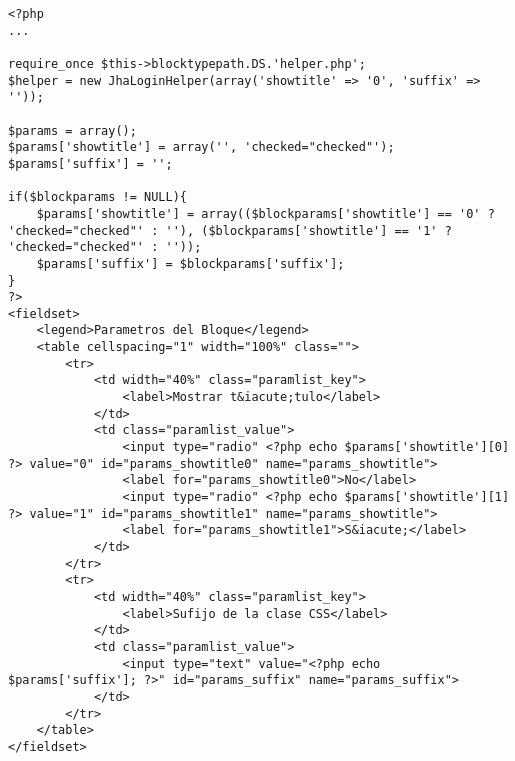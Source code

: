 \begin{lstlisting}[label=jha_block_login_params,caption=Parametros de configuraci\'on.]
<?php
...

require_once $this->blocktypepath.DS.'helper.php';
$helper = new JhaLoginHelper(array('showtitle' => '0', 'suffix' => ''));

$params = array();
$params['showtitle'] = array('', 'checked="checked"');
$params['suffix'] = '';

if($blockparams != NULL){
	$params['showtitle'] = array(($blockparams['showtitle'] == '0' ? 'checked="checked"' : ''), ($blockparams['showtitle'] == '1' ? 'checked="checked"' : ''));
	$params['suffix'] = $blockparams['suffix'];
}
?>
<fieldset>
    <legend>Parametros del Bloque</legend>
    <table cellspacing="1" width="100%" class="">
        <tr>
            <td width="40%" class="paramlist_key">
                <label>Mostrar t&iacute;tulo</label>
            </td>
            <td class="paramlist_value">
                <input type="radio" <?php echo $params['showtitle'][0] ?> value="0" id="params_showtitle0" name="params_showtitle">
                <label for="params_showtitle0">No</label>
                <input type="radio" <?php echo $params['showtitle'][1] ?> value="1" id="params_showtitle1" name="params_showtitle">
                <label for="params_showtitle1">S&iacute;</label>
            </td>
        </tr>
		<tr>
            <td width="40%" class="paramlist_key">
                <label>Sufijo de la clase CSS</label>
            </td>
            <td class="paramlist_value">
                <input type="text" value="<?php echo $params['suffix']; ?>" id="params_suffix" name="params_suffix">
            </td>
        </tr>
    </table>
</fieldset>
\end{lstlisting}
